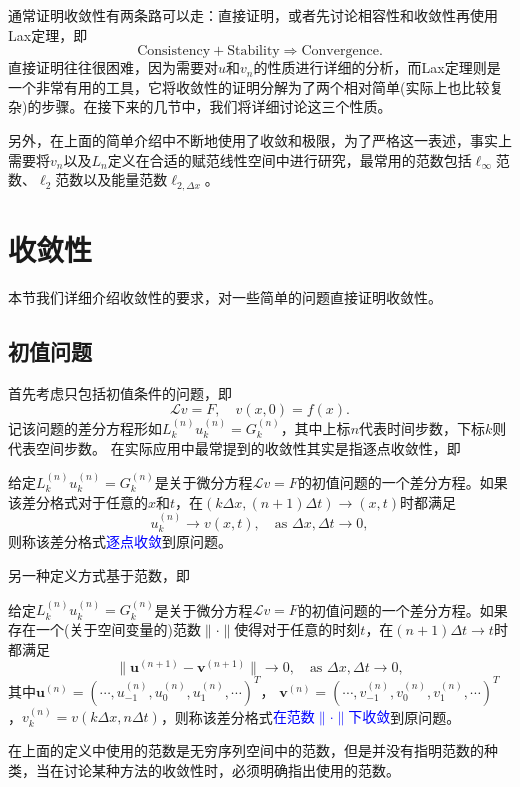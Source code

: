 \documentclass[a4paper,10pt]{ctexart}
\begin{document}
通常证明收敛性有两条路可以走：直接证明，或者先讨论相容性和收敛性再使用Lax定理，即
\begin{equation}
    \text{Consistency} + \text{Stability} \Longrightarrow \text{Convergence}.
\end{equation}
直接证明往往很困难，因为需要对$ u $和$ v_n $的性质进行详细的分析，而Lax定理则是一个非常有用的工具，它将收敛性的证明分解为了两个相对简单(实际上也比较复杂)的步骤。在接下来的几节中，我们将详细讨论这三个性质。

另外，在上面的简单介绍中不断地使用了收敛和极限，为了严格这一表述，事实上需要将$ v_n $以及$ L_n $定义在合适的赋范线性空间中进行研究，最常用的范数包括$ \ell_\infty $范数、$ \ell_{2} $范数以及能量范数$ \ell_{2, \Delta x} $。

\section{收敛性}
本节我们详细介绍收敛性的要求，对一些简单的问题直接证明收敛性。

\subsection{初值问题}
首先考虑只包括初值条件的问题，即
\[
    \mathcal{L}v = F,\quad v(x,0) = f(x).
\]
记该问题的差分方程形如$ L_k^{(n)}u^{(n)}_k = G^{(n)}_k $，其中上标$ n $代表时间步数，下标$ k $则代表空间步数。
在实际应用中最常提到的收敛性其实是指逐点收敛性，即
\begin{definition}
    给定$ L_k^{(n)}u^{(n)}_k = G^{(n)}_k $是关于微分方程$ \mathcal{L}v=F $的初值问题的一个差分方程。如果该差分格式对于任意的$ x $和$ t $，在$ (k \Delta x,(n+1)\Delta t)\to (x,t) $时都满足
    \begin{equation}
        u^{(n)}_k\longrightarrow v(x,t), \quad \text{as } \Delta x,\Delta t\longrightarrow 0,
    \end{equation}
    则称该差分格式\textcolor{blue}{逐点收敛}到原问题。
\end{definition}
另一种定义方式基于范数，即
\begin{definition}
    给定$ L_k^{(n)}u^{(n)}_k = G^{(n)}_k $是关于微分方程$ \mathcal{L}v=F $的初值问题的一个差分方程。如果存在一个(关于空间变量的)范数$ \|\cdot\| $使得对于任意的时刻$ t $，在$ (n+1)\Delta t\to t $时都满足
    \begin{equation}
        \|\bm{u}^{(n+1)} - \bm{v}^{(n+1)}\| \longrightarrow 0, \quad \text{as } \Delta x,\Delta t\longrightarrow 0,
    \end{equation}
    其中$ \bm{u}^{(n)} = (\cdots ,u_{-1}^{(n)}, u_0^{(n)},u_1^{(n)},\cdots )^T $， $ \bm{v}^{(n)} = (\cdots ,v_{-1}^{(n)}, v_0^{(n)},v_1^{(n)},\cdots )^T $，$ v^{(n)}_k = v(k\Delta x, n \Delta t) $，则称该差分格式\textcolor{blue}{在范数$ \| \cdot \| $下收敛}到原问题。
\end{definition}
\noindent 在上面的定义中使用的范数是无穷序列空间中的范数，但是并没有指明范数的种类，当在讨论某种方法的收敛性时，必须明确指出使用的范数。
\end{document}
